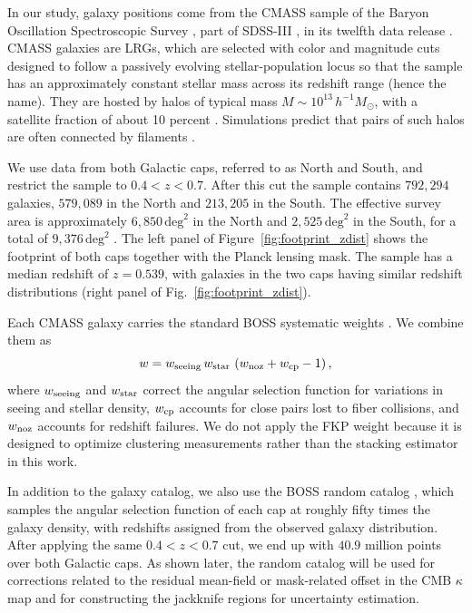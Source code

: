 \documentclass[twocolumn,anonymous,linenumbers]{aastex701}
\newcommand{\hinvMsun}{h^{-1}M_\odot}
\begin{document}
In our study, galaxy positions come from the CMASS sample of the Baryon Oscillation
Spectroscopic Survey \citep[BOSS;][]{Dawson2013}, part of SDSS-III 
\citep{Eisenstein2011}, in its twelfth data release
\citep{Alam2015, Reid2016}. CMASS galaxies are LRGs, which are selected with color and
magnitude cuts designed to follow a passively evolving stellar-population
locus so that the sample has an approximately constant stellar mass across
its redshift range (hence the name). They are
hosted by halos of typical mass $M\sim 10^{13}\,\hinvMsun$,
with a satellite fraction of about 10 percent \citep{White2011}. 
Simulations predict that pairs of such halos are often connected by filaments \citep{Colberg2005}.

We use data from both Galactic caps, referred to as North and South, and restrict the sample to $0.4<z<0.7$. After this cut the sample contains $792{,}294$ galaxies, $579{,}089$ in the
North and $213{,}205$ in the South. The effective survey area is approximately $6{,}850\,\mathrm{deg}^{2}$ in the North and $2{,}525\,\mathrm{deg}^{2}$ in the South, for a total of
$9{,}376\,\mathrm{deg}^{2}$ \citep{Reid2016}. The left panel of Figure~\ref{fig:footprint_zdist} shows the footprint of both caps together with the Planck lensing mask. The sample has a median redshift of $z=0.539$, with galaxies in the two caps having similar redshift distributions (right panel of Fig.~\ref{fig:footprint_zdist}).

Each CMASS galaxy carries the standard BOSS systematic weights 
\citep{Ross2012, Reid2016}. We combine them as
\begin{equation}
  w = w_{\rm seeing}\, w_{\rm star}\,
      \left(w_{\rm noz} + w_{\rm cp} - 1\right),
  \label{eq:weights}
\end{equation}
where $w_{\rm seeing}$ and $w_{\rm star}$ correct the angular selection
function for variations in seeing and stellar density, $w_{\rm cp}$ accounts
for close pairs lost to fiber collisions, and $w_{\rm noz}$ accounts for
redshift failures. We do not apply the FKP weight because it is designed to
optimize clustering measurements rather than the stacking estimator in this work.

In addition to the galaxy catalog, we also use the BOSS random catalog \citep{Reid2016}, which samples the angular selection function of each cap at roughly fifty times the galaxy density, with redshifts assigned from the observed galaxy distribution. After applying the
same $0.4<z<0.7$ cut, we end up with $40.9$ million points over both Galactic caps. 
As shown later, the random catalog will be used for corrections related to the residual 
mean-field or mask-related offset in the CMB $\kappa$ map and for constructing the jackknife regions for uncertainty estimation.
\end{document}
